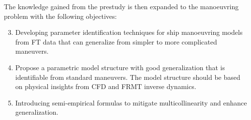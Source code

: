 \vspace{0.1 cm}
\noindent The knowledge gained from the prestudy is then expanded to the manoeuvring problem with the following objectives: 
\begin{enumerate}[label=(\Alph*),itemsep=1mm]
    \setcounter{enumi}{2}

    \item Developing parameter identification techniques for ship manoeuvring models from FT data that can generalize from simpler to more complicated maneuvers.

    \item Propose a parametric model structure with good generalization that is identifiable from standard maneuvers. The model structure should be based on physical insights from CFD and FRMT inverse dynamics.

    \item Introducing semi-empirical formulas to mitigate multicollinearity and enhance generalization.
    
\end{enumerate}
